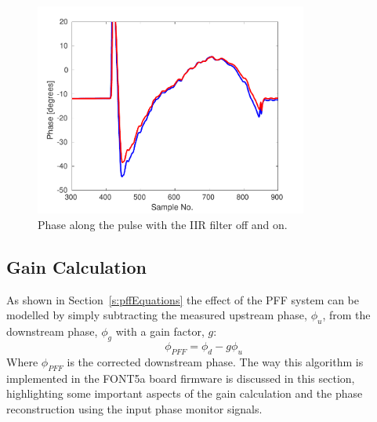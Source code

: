 \begin{figure}
  \centering
  \includegraphics[width=0.8\textwidth]{Figures/commissioning/iirPhaseFiltOffOn}
  \caption{Phase along the pulse with the IIR filter off and on.}
  \label{f:iirPhasefiltOffOn}
\end{figure}


\subsection{Gain Calculation}
\label{ss:fontGain}

As shown in Section~\ref{s:pffEquations} the effect of the PFF system can be modelled by simply subtracting the measured upstream phase, \(\phi_u\), from the downstream phase, \(\phi_g\) with a gain factor, \(g\):
\begin{equation} \label{e:realGainEqn}
\phi_{PFF} = \phi_d - g\phi_u
\end{equation}
Where \(\phi_{PFF}\) is the corrected downstream phase. The way this algorithm is implemented in the FONT5a board firmware is discussed in this section, highlighting some important aspects of the gain calculation and the phase reconstruction using the input phase monitor signals.

